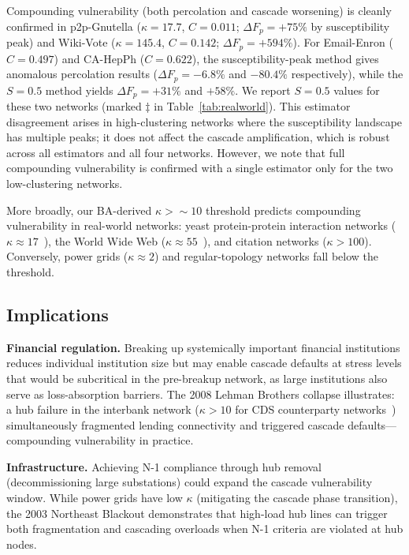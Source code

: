 \documentclass[aps,pre,twocolumn,superscriptaddress,showpacs]{revtex4-2}
\newcommand{\DF}{\Delta F}
\begin{document}
Compounding vulnerability (both percolation and cascade worsening) is cleanly confirmed in p2p-Gnutella ($\kappa=17.7$, $C=0.011$; $\DF_p=+75\%$ by susceptibility peak) and Wiki-Vote ($\kappa=145.4$, $C=0.142$; $\DF_p=+594\%$). For Email-Enron ($C=0.497$) and CA-HepPh ($C=0.622$), the susceptibility-peak method gives anomalous percolation results ($\DF_p=-6.8\%$ and $-80.4\%$ respectively), while the $S=0.5$ method yields $\DF_p=+31\%$ and $+58\%$. We report $S=0.5$ values for these two networks (marked $\ddag$ in Table~\ref{tab:realworld}). This estimator disagreement arises in high-clustering networks where the susceptibility landscape has multiple peaks; it does not affect the cascade amplification, which is robust across all estimators and all four networks. However, we note that full compounding vulnerability is confirmed with a single estimator only for the two low-clustering networks.

More broadly, our BA-derived $\kappa > {\sim}10$ threshold predicts compounding vulnerability in real-world networks: yeast protein-protein interaction networks ($\kappa \approx 17$~\cite{Jeong2001}), the World Wide Web ($\kappa \approx 55$~\cite{Albert1999}), and citation networks ($\kappa > 100$). Conversely, power grids ($\kappa \approx 2$) and regular-topology networks fall below the threshold.

\subsection{Implications}
\label{sec:implications}

\textbf{Financial regulation.} Breaking up systemically important financial institutions reduces individual institution size but may enable cascade defaults at stress levels that would be subcritical in the pre-breakup network, as large institutions also serve as loss-absorption barriers. The 2008 Lehman Brothers collapse illustrates: a hub failure in the interbank network ($\kappa > 10$ for CDS counterparty networks~\cite{Battiston2012,Haldane2011}) simultaneously fragmented lending connectivity and triggered cascade defaults---compounding vulnerability in practice.

\textbf{Infrastructure.} Achieving N-1 compliance through hub removal (decommissioning large substations) could expand the cascade vulnerability window. While power grids have low $\kappa$ (mitigating the cascade phase transition), the 2003 Northeast Blackout demonstrates that high-load hub lines can trigger both fragmentation and cascading overloads when N-1 criteria are violated at hub nodes.
\end{document}
